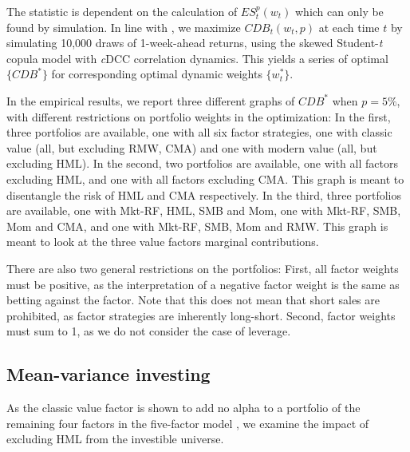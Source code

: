The statistic is dependent on the calculation of $ES^p_t(w_t)$ which can only be found by simulation. In line with \textcite{ChristoffersenErrunzaJacobLanglois2012}, we maximize $CDB_t(w_t,p)$ at each time $t$ by simulating 10,000 draws of 1-week-ahead returns, using the skewed Student-\textit{t} copula model with \textit{c}DCC correlation dynamics. This yields a series of optimal $\{CDB^*\}$ for corresponding optimal dynamic weights $\{w^*_t\}$.

In the empirical results, we report three different graphs of $CDB^*$ when $p=5\%$, with different restrictions on portfolio weights in the optimization: In the first, three portfolios are available, one with all six factor strategies, one with classic value (all, but excluding RMW, CMA) and one with modern value (all, but excluding HML). In the second, two portfolios are available, one with all factors excluding HML, and one with all factors excluding CMA. This graph is meant to disentangle the risk of HML and CMA respectively. In the third, three portfolios are available, one with Mkt-RF, HML, SMB and Mom, one with Mkt-RF, SMB, Mom and CMA, and one with Mkt-RF, SMB, Mom and RMW. This graph is meant to look at the three value factors marginal contributions.

There are also two general restrictions on the portfolios: First, all factor weights must be positive, as the interpretation of a negative factor weight is the same as betting against the factor. Note that this does not mean that short sales are prohibited, as factor strategies are inherently long-short. Second, factor weights must sum to 1, as we do not consider the case of leverage.

\subsection{Mean-variance investing}
As the classic value factor is shown to add no alpha to a portfolio of the remaining four factors in the five-factor model \autocite{FF2015}, we examine the impact of excluding HML from the investible universe.

